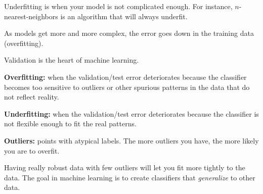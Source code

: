 Underfitting is when your model is not complicated enough.
For instance, $n$-nearest-neighbors is an algorithm that will always underfit.

As models get more and more complex, the error goes down in the training data (overfitting).

Validation is the heart of machine learning.

\textbf{Overfitting:} when the validation/test error deteriorates because the classifier becomes too sensitive to outliers or other spurious patterns in the data that do not reflect reality.

\textbf{Underfitting:} when the validation/test error deteriorates because the classifier is not flexible enough to fit the real patterns.

\textbf{Outliers:} points with atypical labels.
The more outliers you have, the more likely you are to overfit.

Having really robust data with few outliers will let you fit more tightly to the data.
The goal in machine learning is to create classifiers that \textit{generalize} to other data.